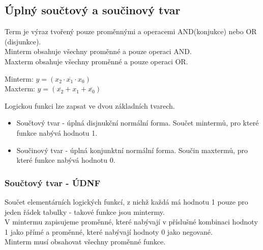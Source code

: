 \subsection{Úplný součtový a součinový tvar}
Term je výraz tvořený pouze proměnnými a operacemi AND(konjukce) nebo OR (disjunkce).\\
Minterm obsahuje všechny proměnné a pouze operaci AND.\\
Maxterm obsahuje všechny proměnné a pouze operaci OR.
\begin{center}
    Minterm: \(y = (x_2 \cdot \overline{x_1} \cdot x_0)\)\\
    Maxterm: \(y = (\overline{x_2} + x_1 + \overline{x_0})\)
\end{center}

Logickou funkci lze zapsat ve dvou základních tvarech.\\
\begin{itemize}
    \item Součtový tvar - úplná disjnukční normální forma. Součet mintermů, pro které funkce nabývá hodnotu 1.
    \item Součinový tvar - úplná konjunktní normální forma. Součin maxtermů, pro které funkce nabývá hodnotu 0.
\end{itemize}

\subsubsection{Součtový tvar - ÚDNF}
Součet elementárních logických funkcí, z nichž každá má hodnotu 1 pouze pro jeden řádek tabulky - takové funkce jsou mintermy.\\
V mintermu zapisujeme proměnné, které nabývají v příslušné kombinaci hodnoty 1 jako přímé a proměnné, které nabývají hodnoty 0 jako negované.\\
Minterm musí obsahovat všechny proměnné funkce.\\

